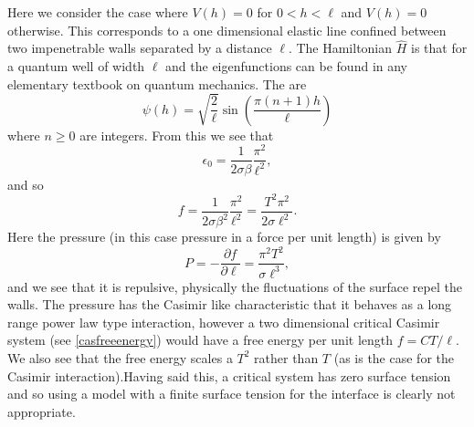 Here we consider the case where $V(h)= 0$ for $0<h<\ell$ and $V(h)=0$ otherwise. This corresponds to a one dimensional elastic line confined between two impenetrable walls separated by a distance $\ell$. The Hamiltonian $\hat H$ is that for a quantum well of width $\ell$ and the eigenfunctions can be found in any elementary textbook on quantum mechanics. The are
\begin{equation}
    \psi(h) = \sqrt{\frac{2}{\ell}}\sin(\frac{\pi(n+1)h}{\ell})
\end{equation}
where $n\geq 0$ are integers. From this we see that
\begin{equation}
    \epsilon_0 = \frac{1}{2\sigma\beta}\frac{\pi^2}{\ell^2},
\end{equation}
and so
\begin{equation}
    f = \frac{1}{2\sigma\beta^2}\frac{\pi^2}{\ell^2}= \frac{T^2\pi^2}{2\sigma\ell^2}.
\end{equation}
Here the pressure (in this case pressure in a force per unit length) is given by
\begin{equation}
    P = -\frac{\partial f}{\partial \ell} = \frac{\pi^2 T^2}{\sigma\ell^3},
    \label{pfree}
\end{equation}
and we see that it is repulsive, physically the fluctuations of the surface repel the walls. 
The pressure has the Casimir like characteristic that it behaves as a long range power law type interaction, however a two dimensional critical Casimir system (see \eqref{casfreeenergy}) would have a free energy per unit length $f=CT/\ell$. We also see that the free energy scales  a $T^2$ rather than $T$ (as is the case for the Casimir interaction).Having said this, a critical system has zero surface tension and so using a model with a finite
surface tension for the interface is clearly not appropriate.

